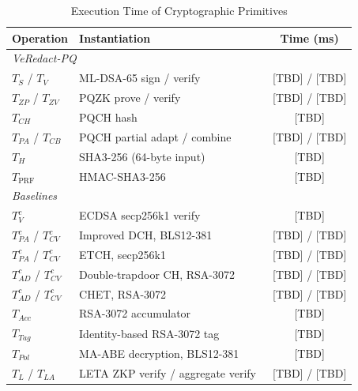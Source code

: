 \documentclass[lettersize,journal]{IEEEtran}
\begin{document}
\begin{table}[t]
\centering
\caption{Execution Time of Cryptographic Primitives}
\label{tab:primitives}
\scriptsize
\renewcommand{\arraystretch}{1.08}
\setlength{\tabcolsep}{4pt}
\begin{tabular}{llc}
\hline
\textbf{Operation} & \textbf{Instantiation} & \textbf{Time (ms)} \\
\hline
\multicolumn{3}{l}{\textit{VeRedact-PQ}} \\
$T_S$ / $T_V$
& ML-DSA-65 sign / verify
& [TBD] / [TBD] \\
$T_{ZP}$ / $T_{ZV}$
& PQZK prove / verify
& [TBD] / [TBD] \\
$T_{CH}$
& PQCH hash
& [TBD] \\
$T_{PA}$ / $T_{CB}$
& PQCH partial adapt / combine
& [TBD] / [TBD] \\
$T_H$
& SHA3-256 (64-byte input)
& [TBD] \\
$T_{\mathrm{PRF}}$
& HMAC-SHA3-256
& [TBD] \\
\hline
\multicolumn{3}{l}{\textit{Baselines}} \\
$T_V^{c}$
& ECDSA secp256k1 verify~\cite{ref1,ref27}
& [TBD] \\
$T_{PA}^{c}$ / $T_{CV}^{c}$
& Improved DCH, BLS12-381~\cite{ref1}
& [TBD] / [TBD] \\
$T_{PA}^{c}$ / $T_{CV}^{c}$
& ETCH, secp256k1~\cite{ref27}
& [TBD] / [TBD] \\
$T_{AD}^{c}$ / $T_{CV}^{c}$
& Double-trapdoor CH, RSA-3072~\cite{ref13}
& [TBD] / [TBD] \\
$T_{AD}^{c}$ / $T_{CV}^{c}$
& CHET, RSA-3072~\cite{ref34}
& [TBD] / [TBD] \\
$T_{Acc}$
& RSA-3072 accumulator~\cite{ref1,ref13}
& [TBD] \\
$T_{Tag}$
& Identity-based RSA-3072 tag~\cite{ref13}
& [TBD] \\
$T_{Pol}$
& MA-ABE decryption, BLS12-381~\cite{ref34}
& [TBD] \\
\textcolor{e2}{$T_{L}$ / $T_{LA}$}
& \textcolor{e2}{LETA ZKP verify / aggregate verify~\cite{ref39}}
& \textcolor{e2}{[TBD] / [TBD]} \\
\hline
\end{tabular}
\end{table}
\end{document}
